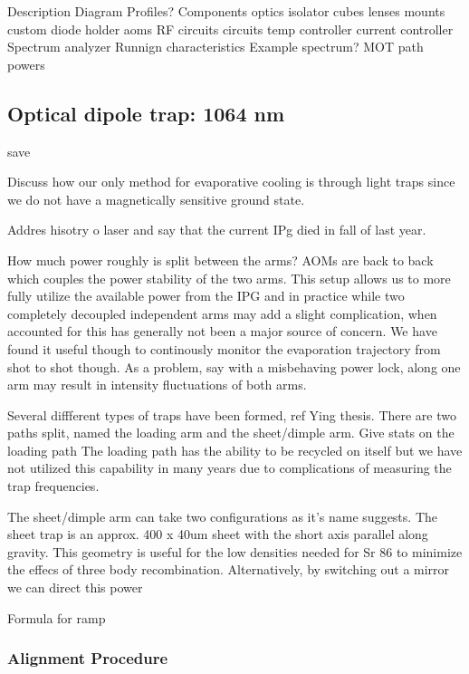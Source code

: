 Description
Diagram
	Profiles?
Components
	optics
		isolator
		cubes
		lenses
	mounts
		custom diode holder
	aoms
		RF circuits
	circuits
		temp controller
		current controller
	Spectrum analyzer
Runnign characteristics
	Example spectrum?
	MOT path powers

\subsection{Optical dipole trap: 1064 nm} \label{ssec:1064sys}

save

Discuss how our only method for evaporative cooling is through light traps since we do not have a magnetically sensitive ground state.

Addres hisotry o laser and say that the current IPg died in fall of last year. 

How much power roughly is split between the arms? AOMs are back to back which couples the power stability of the two arms. This setup allows us to more fully utilize the available power from the IPG and in practice while two completely decoupled independent arms may add a slight complication, when accounted for this has generally not been a major source of concern. We have found it useful though to continously monitor the evaporation trajectory from shot to shot though. As a problem, say with a misbehaving power lock, along one arm may result in intensity fluctuations of both arms.

Several diffferent types of traps have been formed, ref Ying thesis. There are two paths split, named the loading arm and the sheet/dimple arm. Give stats on the loading path The loading path has the ability to be recycled on itself but we have not utilized this capability in many years due to complications of measuring the trap frequencies. 

The sheet/dimple arm can take two configurations as it's name suggests. The sheet trap is an approx. 400 x 40um sheet with the short axis parallel along gravity. This geometry is useful for the low densities needed for Sr 86 to minimize the effecs of three body recombination. Alternatively, by switching out a mirror we can direct this power

Formula for ramp

\subsubsection{Alignment Procedure} \label{sssec:1064_align}

